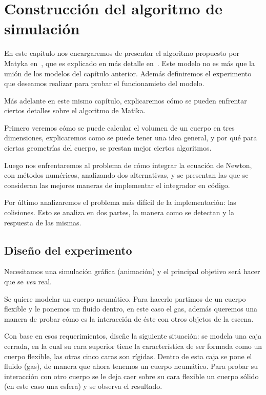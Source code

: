 \chapter{Construcción del algoritmo de simulación}

En este capítulo nos encargaremos de presentar el algoritmo propuesto por Matyka en~\cite{Matyka:Presion}, que es explicado en más detalle en~\cite{Matika:SoftBody}. Este modelo no es más que la unión de los modelos del capítulo anterior. Además definiremos el experimento que deseamos realizar para probar el funcionamieto del modelo.

Más adelante en este mismo capítulo, explicaremos cómo se pueden enfrentar ciertos detalles sobre el algoritmo de Matika.

Primero veremos cómo se puede calcular el volumen de un cuerpo en tres dimensiones, explicaremos como se puede tener una idea general, y por qué para ciertas geometrías del cuerpo, se prestan mejor ciertos algoritmos.

Luego nos enfrentaremos al problema de cómo integrar la ecuación de Newton, con métodos numéricos, analizando dos alternativas, y se presentan las que se consideran las mejores maneras de implementar el integrador en código.

Por último analizaremos el problema más difícil de la implementación: las colisiones. Esto se analiza en dos partes, la manera como se detectan y la respuesta de las mismas.

\section{Diseño del experimento}
\label{descripcion:experimento}
Necesitamos una simulación gráfica (animación) y el principal objetivo será hacer que se \emph{vea} real.

Se quiere modelar un cuerpo neumático. Para hacerlo partimos de un cuerpo flexible y le ponemos un fluido dentro, en este caso el gas, además queremos una manera de probar cómo es la interacción de éste con otros objetos de la escena. 

Con base en esos requerimientos, diseñe la siguiente situación: se modela una caja cerrada, en la cual su cara superior tiene la característica de ser formada como un cuerpo flexible, las otras cinco caras son rígidas. Dentro de esta caja se pone el fluido (gas), de manera que ahora tenemos un cuerpo neumático. Para probar su interacción con otro cuerpo se le deja caer sobre su cara flexible un cuerpo sólido (en este caso una esfera) y se observa el resultado.

